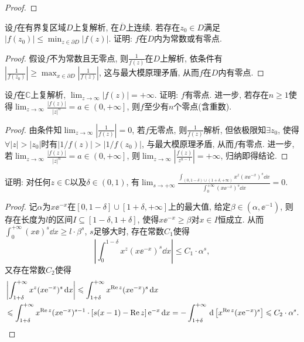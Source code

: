 \begin{quiza}
\begin{proof}
\end{proof}
\woe 设\(f\)在有界复区域\(D\)上复解析, 在\(\overline{D}\)上连续. 若存在\(z_0\in D\)满足\(|f(z_0)|\leqslant\min_{z\in\partial D}|f(z)|\). 证明: \(f\)在\(D\)内为常数或有零点.
\begin{proof}
假设\(f\)不为常数且无零点, 则\(\frac{1}{f(z)}\)在\(D\)上解析, 依条件有\(\left|\frac{1}{f(z_0)}\right|\geqslant\max_{x\in\partial D}\left|\frac{1}{f(z)}\right|\), 这与最大模原理矛盾, 从而\(f\)在\(D\)内有零点.
\end{proof}
\woe 设\(f\)在\(\mathbb{C}\)上复解析, \(\lim_{z\rightarrow\infty}|f(z)|=+\infty\). 证明: \(f\)有零点. 进一步, 若存在\(n\geqslant 1\)使得\(\lim_{z\rightarrow\infty}\frac{|f(z)|}{|z|^n}=a\in\left(0,+\infty\right]\), 则\(f\)至少有\(n\)个零点(含重数).
\begin{proof}
由条件知\(\lim_{z\rightarrow\infty}\left|\frac{1}{f(z)}\right|=0\), 若\(f\)无零点, 则\(\frac{1}{f(z)}\)解析, 但依极限知\(\exists z_0\), 使得\(\forall |z|>|z_0|\)时有\(\left|1/f(z)\right|>\left|1/f(z_0)\right|\), 与最大模原理矛盾, 从而\(f\)有零点. 进一步, 若\(\lim_{z\rightarrow\infty}\frac{\left|f(z)\right|}{|z|^n}=a\in\left(0,+\infty\right]\), 则\(\lim_{z\rightarrow\infty}\left|\frac{f(z)}{z^{n-1}}\right|=+\infty\), 归纳即得结论. 
\end{proof}
\woe 证明: 对任何\(z\in\mathbb{C}\)以及\(\delta\in(0,1)\), 有\(\lim_{s\rightarrow+\infty}\frac{\displaystyle\int_{(0,1-\delta)\cup(1+\delta,+\infty)}x^z\left(x\ee^{-x}\right)^s\dd x}{\displaystyle\int_{0}^{+\infty}\left(x\ee^{-x}\right)^s\dd x}=0.\)
\begin{proof}
记\(\alpha\)为\(x\ee^{-x}\)在\([0,1-\delta]\cup[1+\delta,+\infty]\)上的最大值, 给定\(\beta\in(\alpha,\ee^{-1})\), 则存在长度为\(l\)的区间\(I\subseteq[1-\delta,1+\delta]\), 使得\(x\ee^{-x}\geqslant \beta\)对\(x\in I\)恒成立. 从而\(\int_{0}^{+\infty}\left(x\ee\right)^s\dd x\geqslant l\cdot\beta^s\), \(s\)足够大时, 存在常数\(C_1\)使得\[\left|\int_{0}^{1-\delta}x^z(x\ee^{-x})^{s}\dd x\right|\leqslant C_1\cdot\alpha^s,\]又存在常数\(C_2\)使得\[\begin{split}
&\left|\int_{1+\delta}^{+\infty}x^z(x\mathrm{e}^{-x})^s\,\mathrm{d} x\right|\leqslant\int_{1+\delta}^{+\infty}x^{\mathrm{Re}\,z}(x\mathrm{e}^{-x})^s\,\mathrm{d} x\\&\leqslant\int_{1+\delta}^{+\infty}x^{\mathrm{Re}\, z}(x\mathrm{e}^{-x})^{s-1}\cdot\left[s(x-1)-\mathrm{Re}\,z\right]\mathrm{e}^{-x}\,\mathrm{d} x=-\int_{1+\delta}^{+\infty}\,\mathrm{d}\left[x^{\mathrm{Re}\, z}(x\mathrm{e}^{-x})^s\right]\leqslant C_2\cdot\alpha^s.\qedhere
\end{split}\]
\end{proof}
\end{quiza}
